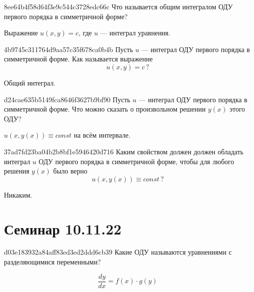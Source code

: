 \begin{note}{8ee64b4f58d64f3e9c544c3728edc66c}
    Что называется общим интегралом ОДУ первого порядка в симметричной форме?

    \begin{cloze}{1}
        Выражение \({ u(x, y) = c }\), где \({ u }\) --- интеграл уравнения.
    \end{cloze}
\end{note}

\begin{note}{4b9745c311764d9aa57c35f678ca0b4b}
    Пусть \({ u }\) --- интеграл ОДУ первого порядка в симметричной форме.
    Как называется выражение
    \[
        u(x, y) = c\,?
    \]

    \begin{cloze}{1}
        Общий интеграл.
    \end{cloze}
\end{note}

\begin{note}{d24cae635b5149fca8646f3627b9bf90}
    Пусть \({ u }\) --- интеграл ОДУ первого порядка в симметричной форме.
    Что можно сказать о произвольном решении \({ y(x) }\) этого ОДУ?

    \begin{cloze}{1}
        \({ u(x, y(x)) \equiv const }\) на всём интервале.
    \end{cloze}
\end{note}

\begin{note}{37ad7fd23ba04b2b8bf1e5946420d716}
    Каким свойством должен должен обладать интеграл \({ u }\) ОДУ первого порядка в симметричной форме, чтобы для любого решения \({ y(x) }\) было верно
    \[
        u(x, y(x)) \equiv const\,?
    \]

    \begin{cloze}{1}
        Никаким.
    \end{cloze}
\end{note}

\section{Семинар 10.11.22}
\begin{note}{d03e183932a84aff83ed3ed2ddd6cb39}
    Какие ОДУ называются уравнениями с разделяющимися переменными?

    \begin{cloze}{1}
        \[
            \frac{dy}{dx} = f(x) \cdot g(y)
        \]
    \end{cloze}
\end{note}

